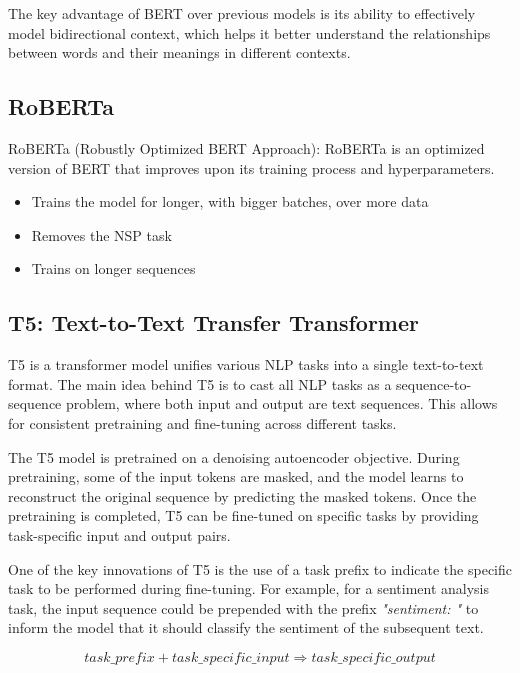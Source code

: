 \documentclass[12pt]{article}
\begin{document}
The key advantage of BERT over previous models is its ability to effectively model bidirectional context, which helps it better understand the relationships between words and their meanings in different contexts.

\subsection{RoBERTa}
RoBERTa (Robustly Optimized BERT Approach): RoBERTa is an optimized version of BERT that improves upon its training process and hyperparameters. 

\begin{itemize}
	\item Trains the model for longer, with bigger batches, over more data
	\item Removes the NSP task
	\item Trains on longer sequences
\end{itemize}

\subsection{T5: Text-to-Text Transfer Transformer}
T5 is a transformer model unifies various NLP tasks into a single text-to-text format. The main idea behind T5 is to cast all NLP tasks as a sequence-to-sequence problem, where both input and output are text sequences. This allows for consistent pretraining and fine-tuning across different tasks.

The T5 model is pretrained on a denoising autoencoder objective. During pretraining, some of the input tokens are masked, and the model learns to reconstruct the original sequence by predicting the masked tokens. Once the pretraining is completed, T5 can be fine-tuned on specific tasks by providing task-specific input and output pairs.

One of the key innovations of T5 is the use of a task prefix to indicate the specific task to be performed during fine-tuning. For example, for a sentiment analysis task, the input sequence could be prepended with the prefix \textit{"sentiment: "} to inform the model that it should classify the sentiment of the subsequent text.

\begin{equation}
\textit{task\_prefix} + \textit{task\_specific\_input} \Rightarrow \textit{task\_specific\_output}
\end{equation}
\end{document}
